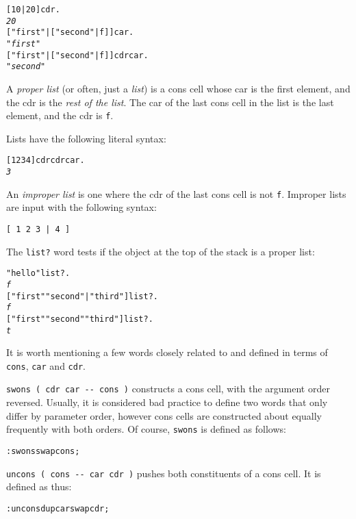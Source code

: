 \documentclass[english]{article}
\begin{document}
\begin{alltt}
{[} 10 | 20 {]} cdr .
\emph{20}
{[} "first" | {[} "second" | f {]} {]} car .
\emph{"first"}
{[} "first" | {[} "second" | f {]} {]} cdr car .
\emph{"second"}
\end{alltt}

A \emph{proper list} (or often, just a \emph{list}) is a cons cell whose car is the first element, and the cdr is the \emph{rest of the list}. The car of the last cons cell in the list is the last element, and the cdr is \texttt{f}.

Lists have the following literal
syntax:

\begin{alltt}
{[} 1 2 3 4 {]} cdr cdr car .
\emph{3}
\end{alltt}

An \emph{improper list} is one where the cdr of the last cons cell is not \texttt{f}. Improper lists are input with the following syntax:

\begin{verbatim}
[ 1 2 3 | 4 ]
\end{verbatim}

The \texttt{list?} word tests if the object at the top of the stack
is a proper list:

\begin{alltt}
"hello" list? .
\emph{f}
{[} "first" "second" | "third" {]} list? .
\emph{f}
{[} "first" "second" "third" {]} list? .
\emph{t}
\end{alltt}

It is worth mentioning a few words closely related to and defined in terms of \texttt{cons}, \texttt{car} and \texttt{cdr}.

\texttt{swons ( cdr car -{}- cons )} constructs a cons cell, with the argument order reversed. Usually, it is considered bad practice to define two words that only differ by parameter order, however cons cells are constructed about equally frequently with both orders. Of course, \texttt{swons} is defined as follows:

\begin{alltt}
: swons swap cons ;
\end{alltt}

\texttt{uncons ( cons -{}- car cdr )} pushes both constituents of a cons cell. It is defined as thus:

\begin{alltt}
: uncons dup car swap cdr ;
\end{alltt}
\end{document}
